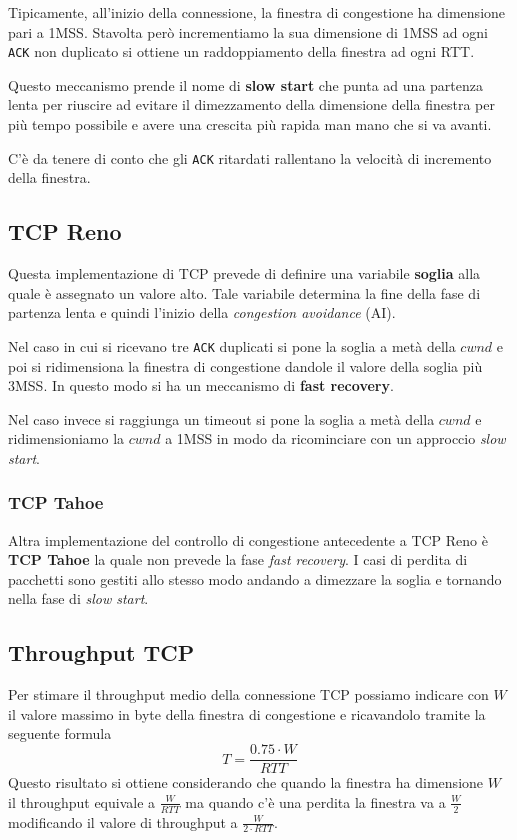 Tipicamente, all'inizio della connessione, la finestra di congestione ha dimensione pari a 1MSS.
Stavolta però incrementiamo la sua dimensione di 1MSS ad ogni \verb|ACK| non duplicato si ottiene
un raddoppiamento della finestra ad ogni RTT.

Questo meccanismo prende il nome di \textbf{slow start} che punta ad una partenza lenta per 
riuscire ad evitare il dimezzamento della dimensione della finestra per più tempo possibile e
avere una crescita più rapida man mano che si va avanti.

C'è da tenere di conto che gli \verb|ACK| ritardati rallentano la velocità di incremento della
finestra.

\subsection{TCP Reno}
Questa implementazione di TCP prevede di definire una variabile \textbf{soglia} alla quale è 
assegnato un valore alto. Tale variabile determina la fine della fase di partenza lenta e quindi 
l'inizio della \emph{congestion avoidance} (AI).

Nel caso in cui si ricevano tre \verb|ACK| duplicati si pone la soglia a metà della $cwnd$ e poi
si ridimensiona la finestra di congestione dandole il valore della soglia più 3MSS. In questo modo
si ha un meccanismo di \textbf{fast recovery}.

Nel caso invece si raggiunga un timeout si pone la soglia a metà della $cwnd$ e ridimensioniamo la
$cwnd$ a 1MSS in modo da ricominciare con un approccio \emph{slow start}.

\subsubsection{TCP Tahoe}
Altra implementazione del controllo di congestione antecedente a TCP Reno è \textbf{TCP Tahoe} la
quale non prevede la fase \emph{fast recovery}. I casi di perdita di pacchetti sono gestiti allo 
stesso modo andando a dimezzare la soglia e tornando nella fase di \emph{slow start}.

\subsection{Throughput TCP}
Per stimare il throughput medio della connessione TCP possiamo indicare con $W$ il valore massimo
in byte della finestra di congestione e ricavandolo tramite la seguente formula
\[ T = \frac{0.75 \cdot W}{RTT} \]
Questo risultato si ottiene considerando che quando la finestra ha dimensione $W$ il throughput 
equivale a $\frac{W}{RTT}$ ma quando c'è una perdita la finestra va a $\frac{W}{2}$ modificando il
valore di throughput a $\frac{W}{2 \cdot RTT}$.

